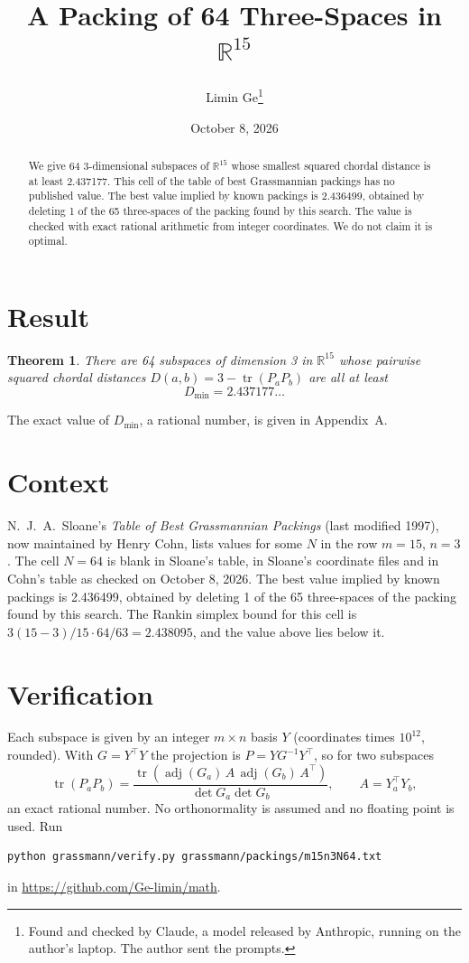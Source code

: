\documentclass[11pt,a4paper]{article}
\title{A Packing of 64 Three-Spaces in $\mathbb{R}^{15}$}
\author{Limin Ge\thanks{Found and checked by Claude, a model released by Anthropic, running on the author's laptop. The author sent the prompts.}}
\date{October 8, 2026}
\newtheorem*{theorem}{Theorem}
\begin{document}
\maketitle
\begin{abstract}
We give 64 3-dimensional subspaces of $\mathbb{R}^{15}$ whose smallest squared chordal distance is at least 2.437177. This cell of the table of best Grassmannian packings has no published value. The best value implied by known packings is 2.436499, obtained by deleting 1 of the 65 three-spaces of the packing found by this search. The value is checked with exact rational arithmetic from integer coordinates. We do not claim it is optimal.
\end{abstract}

\section{Result}
\begin{theorem}
There are 64 subspaces of dimension 3 in $\mathbb{R}^{15}$ whose pairwise squared chordal distances $D(a,b) = 3 - \operatorname{tr}(P_aP_b)$ are all at least
\[ D_{\min} = 2.437177\ldots \]
\end{theorem}
The exact value of $D_{\min}$, a rational number, is given in Appendix~A.


\section{Context}
N.~J.~A.~Sloane's \emph{Table of Best Grassmannian Packings} (last modified 1997), now maintained by Henry Cohn, lists values for some $N$ in the row $m=15$, $n=3$. The cell $N=64$ is blank in Sloane's table, in Sloane's coordinate files and in Cohn's table as checked on October 8, 2026. The best value implied by known packings is 2.436499, obtained by deleting 1 of the 65 three-spaces of the packing found by this search. The Rankin simplex bound for this cell is $3(15-3)/15\cdot 64/63 = 2.438095$, and the value above lies below it.


\section{Verification}
Each subspace is given by an integer $m\times n$ basis $Y$ (coordinates times $10^{12}$, rounded). With $G=Y^\top Y$ the projection is $P=YG^{-1}Y^\top$, so for two subspaces
\[ \operatorname{tr}(P_aP_b)=\frac{\operatorname{tr}(\operatorname{adj}(G_a)\,A\,\operatorname{adj}(G_b)\,A^\top)}{\det G_a\det G_b},\qquad A=Y_a^\top Y_b, \]
an exact rational number. No orthonormality is assumed and no floating point is used. Run
\begin{verbatim}
python grassmann/verify.py grassmann/packings/m15n3N64.txt
\end{verbatim}
in \url{https://github.com/Ge-limin/math}.
\end{document}
